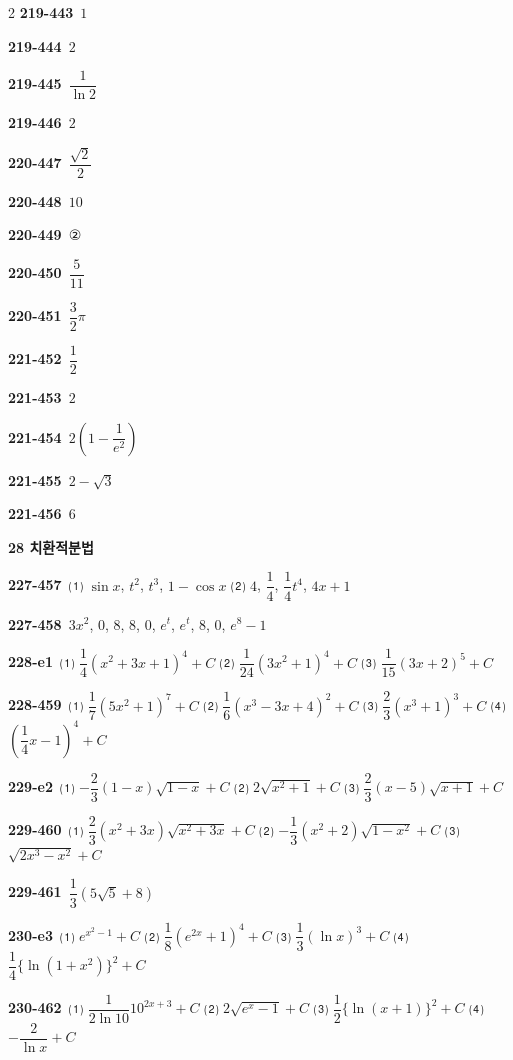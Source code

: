 \documentclass[10pt,a4paper]{article}
\begin{document}
\begin{multicols}{2}
\noindent\textbf{219-443}\ $1$\par
\noindent\textbf{219-444}\ $2$\par
\noindent\textbf{219-445}\ $\dfrac{1}{\ln 2}$\par
\noindent\textbf{219-446}\ $2$\par
\noindent\textbf{220-447}\ $\dfrac{\sqrt{2}}{2}$\par
\noindent\textbf{220-448}\ $10$\par
\noindent\textbf{220-449}\ ②\par
\noindent\textbf{220-450}\ $\dfrac{5}{11}$\par
\noindent\textbf{220-451}\ $\dfrac{3}{2}\pi$\par
\noindent\textbf{221-452}\ $\dfrac{1}{2}$\par
\noindent\textbf{221-453}\ $2$\par
\noindent\textbf{221-454}\ $2\left(1-\dfrac{1}{e^2}\right)$\par
\noindent\textbf{221-455}\ $2-\sqrt{3}$\par
\noindent\textbf{221-456}\ $6$\par
\noindent\textbf{28 치환적분법}\par\smallskip
\noindent\textbf{227-457}\ ⑴ $\sin x$, $t^2$, $t^3$, $1-\cos x$ ⑵ $4$, $\dfrac{1}{4}$, $\dfrac{1}{4}t^4$, $4x+1$\par
\noindent\textbf{227-458}\ $3x^2$, $0$, $8$, $8$, $0$, $e^t$, $e^t$, $8$, $0$, $e^8-1$\par
\noindent\textbf{228-e1}\ ⑴ $\dfrac{1}{4}(x^2+3x+1)^4+C$ ⑵ $\dfrac{1}{24}(3x^2+1)^4+C$ ⑶ $\dfrac{1}{15}(3x+2)^5+C$\par
\noindent\textbf{228-459}\ ⑴ $\dfrac{1}{7}(5x^2+1)^7+C$ ⑵ $\dfrac{1}{6}(x^3-3x+4)^2+C$ ⑶ $\dfrac{2}{3}(x^3+1)^3+C$ ⑷ $\left(\dfrac{1}{4}x-1\right)^4+C$\par
\noindent\textbf{229-e2}\ ⑴ $-\dfrac{2}{3}(1-x)\sqrt{1-x}+C$ ⑵ $2\sqrt{x^2+1}+C$ ⑶ $\dfrac{2}{3}(x-5)\sqrt{x+1}+C$\par
\noindent\textbf{229-460}\ ⑴ $\dfrac{2}{3}(x^2+3x)\sqrt{x^2+3x}+C$ ⑵ $-\dfrac{1}{3}(x^2+2)\sqrt{1-x^2}+C$ ⑶ $\sqrt{2x^3-x^2}+C$\par
\noindent\textbf{229-461}\ $\dfrac{1}{3}(5\sqrt{5}+8)$\par
\noindent\textbf{230-e3}\ ⑴ $e^{x^2-1}+C$ ⑵ $\dfrac{1}{8}(e^{2x}+1)^4+C$ ⑶ $\dfrac{1}{3}(\ln x)^3+C$ ⑷ $\dfrac{1}{4}\{\ln(1+x^2)\}^2+C$\par
\noindent\textbf{230-462}\ ⑴ $\dfrac{1}{2\ln 10}10^{2x+3}+C$ ⑵ $2\sqrt{e^x-1}+C$ ⑶ $\dfrac{1}{2}\{\ln(x+1)\}^2+C$ ⑷ $-\dfrac{2}{\ln x}+C$\par

\end{multicols}
\end{document}
